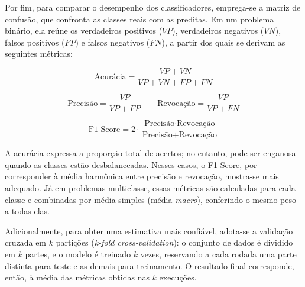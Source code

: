 Por fim, para comparar o desempenho dos classificadores, emprega-se a matriz de confusão, que confronta as classes reais com as preditas. Em um problema binário, ela reúne os verdadeiros positivos ($VP$), verdadeiros negativos ($VN$), falsos positivos ($FP$) e falsos negativos ($FN$), a partir dos quais se derivam as seguintes métricas: %

\begin{equation}
\text{Acurácia} = \frac{VP + VN}{VP + VN + FP + FN}
\end{equation}

\begin{equation}
\text{Precisão} = \frac{VP}{VP + FP} \qquad \text{Revocação} = \frac{VP}{VP + FN}
\end{equation}

\begin{equation}
\text{F1-Score} = 2 \cdot \frac{\text{Precisão} \cdot \text{Revocação}}{\text{Precisão} + \text{Revocação}}
\end{equation}

A acurácia expressa a proporção total de acertos; no entanto, pode ser enganosa quando as classes estão desbalanceadas. Nesses casos, o F1-Score, por corresponder à média harmônica entre precisão e revocação, mostra-se mais adequado. Já em problemas multiclasse, essas métricas são calculadas para cada classe e combinadas por média simples (média \textit{macro}), conferindo o mesmo peso a todas elas.

Adicionalmente, para obter uma estimativa mais confiável, adota-se a validação cruzada em $k$ partições (\textit{k-fold cross-validation}): o conjunto de dados é dividido em $k$ partes, e o modelo é treinado $k$ vezes, reservando a cada rodada uma parte distinta para teste e as demais para treinamento. O resultado final corresponde, então, à média das métricas obtidas nas $k$ execuções. %
